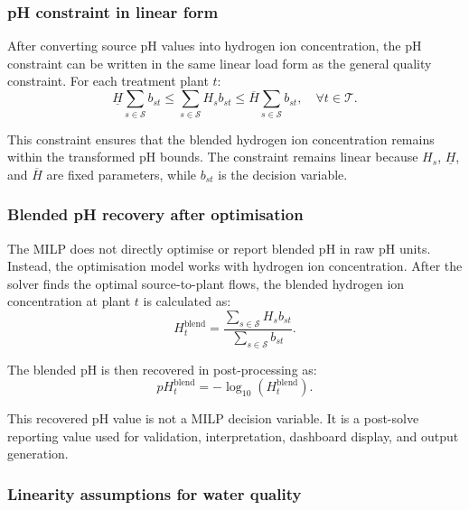 \documentclass[10pt]{article}
\begin{document}
\subsubsection{pH constraint in linear form}

After converting source pH values into hydrogen ion concentration, the pH
constraint can be written in the same linear load form as the general quality
constraint. For each treatment plant $t$:
\begin{equation}
    \underline{H}
    \sum_{s \in \mathcal{S}} b_{st}
    \leq
    \sum_{s \in \mathcal{S}} H_s b_{st}
    \leq
    \overline{H}
    \sum_{s \in \mathcal{S}} b_{st},
    \quad \forall t \in \mathcal{T}.
\end{equation}

This constraint ensures that the blended hydrogen ion concentration remains
within the transformed pH bounds. The constraint remains linear because $H_s$,
$\underline{H}$, and $\overline{H}$ are fixed parameters, while $b_{st}$ is the
decision variable.

\subsubsection{Blended pH recovery after optimisation}

The MILP does not directly optimise or report blended pH in raw pH units.
Instead, the optimisation model works with hydrogen ion concentration. After the
solver finds the optimal source-to-plant flows, the blended hydrogen ion
concentration at plant $t$ is calculated as:
\begin{equation}
    H^{\mathrm{blend}}_{t}
    =
    \frac{
    \sum_{s \in \mathcal{S}} H_s b_{st}
    }{
    \sum_{s \in \mathcal{S}} b_{st}
    }.
\end{equation}

The blended pH is then recovered in post-processing as:
\begin{equation}
    pH^{\mathrm{blend}}_{t}
    =
    -\log_{10}
    \left(
    H^{\mathrm{blend}}_{t}
    \right).
\end{equation}

This recovered pH value is not a MILP decision variable. It is a post-solve
reporting value used for validation, interpretation, dashboard display, and
output generation.

\subsubsection{Linearity assumptions for water quality}
\end{document}
